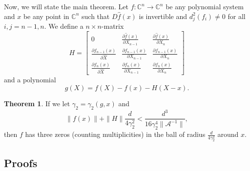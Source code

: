 \documentclass[12pt,oneside,reqno]{amsart}
\theoremstyle{definition}
\newtheorem{thm}{Theorem}
\newcommand{\CC}{\mathbb{C}}
\begin{document}
Now, we will state the main theorem. Let $f:\mathbb{C}^n\rightarrow\mathbb{C}^n$ be any polynomial system and $x$ be any point in $\CC^n$ such that $D\hat{f}(x)$ is invertible and $d_j^2(f_i)\ne 0$ for all $i,j=n-1,n$. We define a $n\times n$-matrix 
\[H=\begin{bmatrix}
0 & \frac{\partial\hat{f}(x)}{\partial X_{n-1}} & \frac{\partial\hat{f}(x)}{\partial X_{n}}\\
\frac{\partial f_{n-1}(x)}{\partial\hat{X}} & \frac{\partial f_{n-1}(x)}{\partial X_{n-1}} & \frac{\partial f_{n-1}(x)}{\partial X_{n}}\\
\frac{\partial f_{n}(x)}{\partial\hat{X}} & \frac{\partial f_{n}(x)}{\partial X_{n-1}} & \frac{\partial f_{n}(x)}{\partial X_{n}}
\end{bmatrix}\]
and a polynomial
\[g(X)= f(X)-f(x)-H(X-x).\]
\begin{thm}\label{thm:clusterthm}
	If we let $\gamma_2=\gamma_2(g,x)$ and \[\|f(x)\|+\|H\|\frac{d}{4\gamma_2^2}<\frac{d^3}{16\gamma_2^4\|\mathcal{A}^{-1}\|},\]
	then $f$ has three zeros (counting multiplicities) in the ball of radius $\frac{d}{4\gamma_2^2}$ around $x$.
\end{thm}
\subsection{Proofs}
\end{document}
